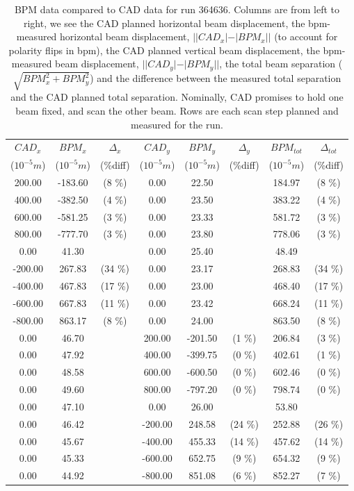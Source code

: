 \begin{table}
\centering
\begin{tabular}{c c c c c c c c}
\toprule
\textbf{$CAD_{x}$} & \textbf{$BPM_{x}$ } & \textbf{$\Delta_{x}$} &\textbf{$CAD_{y}$} & \textbf{$BPM_{y}$} & \textbf{$\Delta_{y}$} & \textbf{$BPM_{tot}$} & \textbf{$\Delta_{tot}$} \\
($10^{-5} m$) & ($10^{-5} m$) & (\%diff) & ($10^{-5} m$) & ($10^{-5} m$) & (\%diff) & ($10^{-5} m$) & (\%diff) \\
\midrule
200.00 & -183.60 &  (8 \%) & 0.00 & 22.50 &  & 184.97 &  (8 \%)\\
400.00 & -382.50 &  (4 \%) & 0.00 & 23.50 &  & 383.22 &  (4 \%)\\
600.00 & -581.25 &  (3 \%) & 0.00 & 23.33 &  & 581.72 &  (3 \%)\\
800.00 & -777.70 &  (3 \%) & 0.00 & 23.80 &  & 778.06 &  (3 \%)\\
0.00 & 41.30 &  & 0.00 & 25.40 &  & 48.49 & \\
-200.00 & 267.83 &  (34 \%) & 0.00 & 23.17 &  & 268.83 &  (34 \%)\\
-400.00 & 467.83 &  (17 \%) & 0.00 & 23.00 &  & 468.40 &  (17 \%)\\
-600.00 & 667.83 &  (11 \%) & 0.00 & 23.42 &  & 668.24 &  (11 \%)\\
-800.00 & 863.17 &  (8 \%) & 0.00 & 24.00 &  & 863.50 &  (8 \%)\\
0.00 & 46.70 &  & 200.00 & -201.50 &  (1 \%) & 206.84 &  (3 \%)\\
0.00 & 47.92 &  & 400.00 & -399.75 &  (0 \%) & 402.61 &  (1 \%)\\
0.00 & 48.58 &  & 600.00 & -600.50 &  (0 \%) & 602.46 &  (0 \%)\\
0.00 & 49.60 &  & 800.00 & -797.20 &  (0 \%) & 798.74 &  (0 \%)\\
0.00 & 47.10 &  & 0.00 & 26.00 &  & 53.80 & \\
0.00 & 46.42 &  & -200.00 & 248.58 &  (24 \%) & 252.88 &  (26 \%)\\
0.00 & 45.67 &  & -400.00 & 455.33 &  (14 \%) & 457.62 &  (14 \%)\\
0.00 & 45.33 &  & -600.00 & 652.75 &  (9 \%) & 654.32 &  (9 \%)\\
0.00 & 44.92 &  & -800.00 & 851.08 &  (6 \%) & 852.27 &  (7 \%)\\
\bottomrule
\end{tabular}
\caption{ BPM data compared to CAD data for run 364636. Columns are from left to right, we see the CAD planned horizontal beam displacement, the bpm-measured horizontal beam displacement, $||CAD_{x}| - |BPM_{x}||$ (to account for polarity flips in bpm), the CAD planned vertical beam displacement, the bpm-measured beam displacement, $||CAD_{y}| - |BPM_{y}||$, the total beam separation ($\sqrt{BPM_{x}^2+BPM_{y}^2}$) and the difference between the measured total separation and the CAD planned total separation. Nominally, CAD promises to hold one beam fixed, and scan the other beam. Rows are each scan step planned and measured for the run. }
\end{table}


